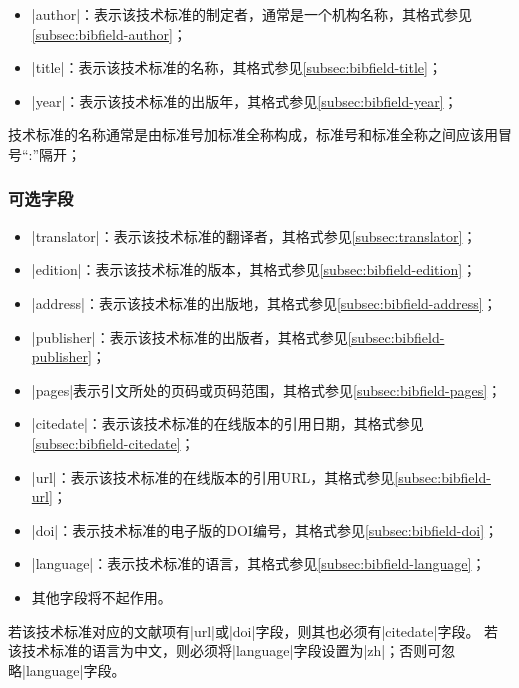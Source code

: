 \begin{itemize}
\item |author|：表示该技术标准的制定者，通常是一个机构名称，其格式参见\ref{subsec:bibfield-author}；
\item |title|：表示该技术标准的名称，其格式参见\ref{subsec:bibfield-title}；
\item |year|：表示该技术标准的出版年，其格式参见\ref{subsec:bibfield-year}；
\end{itemize}

\begin{note}
技术标准的名称通常是由标准号加标准全称构成，标准号和标准全称之间应该用冒号``:''隔开；
\end{note}

\subsubsection{可选字段}

\begin{itemize}
\item |translator|：表示该技术标准的翻译者，其格式参见\ref{subsec:translator}；
\item |edition|：表示该技术标准的版本，其格式参见\ref{subsec:bibfield-edition}；
\item |address|：表示该技术标准的出版地，其格式参见\ref{subsec:bibfield-address}；
\item |publisher|：表示该技术标准的出版者，其格式参见\ref{subsec:bibfield-publisher}；
\item |pages|表示引文所处的页码或页码范围，其格式参见\ref{subsec:bibfield-pages}；
\item |citedate|：表示该技术标准的在线版本的引用日期，其格式参见\ref{subsec:bibfield-citedate}；
\item |url|：表示该技术标准的在线版本的引用URL，其格式参见\ref{subsec:bibfield-url}；
\item |doi|：表示技术标准的电子版的DOI编号，其格式参见\ref{subsec:bibfield-doi}；
\item |language|：表示技术标准的语言，其格式参见\ref{subsec:bibfield-language}；
\item 其他字段将不起作用。
\end{itemize}


\begin{note}
若该技术标准对应的文献项有|url|或|doi|字段，则其也必须有|citedate|字段。
若该技术标准的语言为中文，则必须将|language|字段设置为|zh|；否则可忽略|language|字段。
\end{note}

